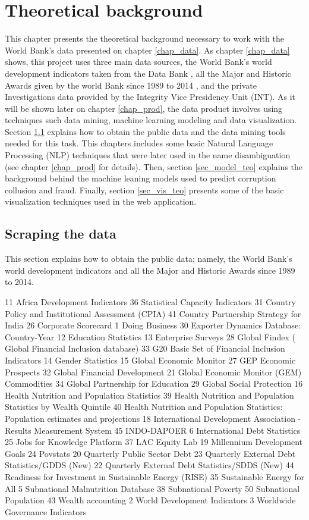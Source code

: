 \chapter{Theoretical background}\label{chap_teo}


This chapter presents the theoretical background necessary to work with the World Bank's data presented on chapter \ref{chap_data}. As chapter \ref{chap_data} shows, this project uses three main data sources, the World Bank's world development indicators taken from the Data Bank \parencite{wb_data}, all the Major and Historic Awards given by the world Bank since 1989 to 2014 \parencite{wb_data}, and the private Investigations data provided by the Integrity Vice Presidency Unit (INT). As it will be shown later on chapter \ref{chap_prod}, the data product involves using techniques such data mining, machine learning modeling and data visualization. 
Section  \ref{sec_scrape} explains how to obtain the public data and the data mining tools needed for this task. This chapters includes some basic Natural Language Processing (NLP) techniques that were later used in the name disambiguation (see chapter \ref{chap_prod} for details). Then, section \ref{sec_model_teo} explains the background behind the machine leaning models used to predict corruption collusion and fraud. Finally, section \ref{sec_vis_teo} presents some of the basic visualization techniques used in the web application.

\section{Scraping the data} \label{sec_scrape}

This section explains how to obtain the public data; namely, the World Bank's world development indicators and all the Major and Historic Awards since 1989 to 2014.

11	Africa Development Indicators
36	Statistical Capacity Indicators
31	Country Policy and Institutional Assessment (CPIA) 
41	Country Partnership Strategy for India 
26	Corporate Scorecard
1 	Doing Business
30	Exporter Dynamics Database: Country-Year
12	Education Statistics
13	Enterprise Surveys
28	Global Findex ( Global Financial Inclusion database)
33	G20 Basic Set of Financial Inclusion Indicators
14	Gender Statistics
15	Global Economic Monitor
27	GEP Economic Prospects
32	Global Financial Development
21	Global Economic Monitor (GEM) Commodities
34	Global Partnership for Education
29	Global Social Protection
16	Health Nutrition and Population Statistics
39	Health Nutrition and Population Statistics by Wealth Quintile
40	Health Nutrition and Population Statistics: Population estimates and projections
18	International Development Association - Results Measurement System
45	INDO-DAPOER
6 	International Debt Statistics
25	Jobs for Knowledge Platform
37	LAC Equity Lab
19	Millennium Development Goals
24	Povstats
20	Quarterly Public Sector Debt
23	Quarterly External Debt Statistics/GDDS (New)
22	Quarterly External Debt Statistics/SDDS (New)
44	Readiness for Investment in Sustainable Energy (RISE)
35	Sustainable Energy for All
5 	Subnational Malnutrition Database
38	Subnational Poverty
50	Subnational Population
43	Wealth accounting
2 	World Development Indicators
3 	Worldwide Governance Indicators


